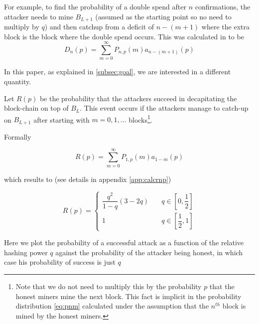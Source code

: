 \documentclass[letterpaper,12pt]{report}
\theoremstyle{plain}
\theoremstyle{definition}
\begin{document}
For example, to find the probability of a double spend after $n$ confirmations, the attacker needs to mine $B_{L+1}$ (assumed as the starting point so no need to multiply by $q$) and then catchup from a deficit of $n-(m+1)$ where the extra block is the block where the double spend occurs.
This was calculated in \cite{Doublespend} to be 
\begin{equation}
D_n(p)=\sum_{m=0}^{\infty}P_{n,p}(m)\mathit{a}_{n-(m+1)}(p)
\end{equation}


In this paper, as explained in \ref{subsec:goal}, we are interested in a different quantity.

Let $\mathit{R(p)}$ be the probability that the attackers succeed in decapitating the block-chain on top of $\mathit{B}_L$. This event occurs if the attackers manage to catch-up on $B_{L+1}$ after starting with $m=0,1,\dots$ blocks\footnote{Note that we do not need to multiply this by the probability $p$ that the honest miners mine the next block. This fact is implicit in the probability distribution \ref{eq:pnm} calculated under the assumption that the $n^{th}$ block is mined by the honest miners.}.

Formally 

\begin{equation}\label{eq:rnpdef}
\mathit{R}(p)=\sum_{m=0}^{\infty}\mathit{P}_{1,p}(m)\mathit{a}_{1-m}(p)
\end{equation}

which results to (see details in appendix \ref{app:calcrnp})

\begin{equation}\label{eq:rp}
\mathit{R}(p)=
\begin{cases}
\dfrac{q^2}{1-q}\left(
3-2q
\right) & \quad q \in [0,\dfrac{1}{2}] \\
1 & \quad q \in [\dfrac{1}{2},1] 
\end{cases}
\end{equation}


Here we plot the probability of a successful attack as a function of the relative hashing power $q$ against the probability of the attacker being honest, in which case his probability of success is just $q$
\end{document}
